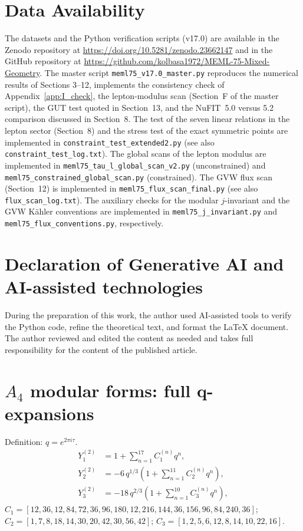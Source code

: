 \documentclass[12pt,a4paper]{article}
\numberwithin{equation}{section}
\begin{document}
\section*{Data Availability}
The datasets and the Python verification scripts (v17.0) are available in the Zenodo repository at \url{https://doi.org/10.5281/zenodo.23662147} and in the GitHub repository at \url{https://github.com/kolbasa1972/MEML-75-Mixed-Geometry}. The master script \texttt{meml75\_v17.0\_master.py} reproduces the numerical results of Sections 3--12, implements the consistency check of Appendix~\ref{app:I_check}, the lepton-modulus scan (Section~F of the master script), the GUT test quoted in Section~13, and the NuFIT~5.0 versus 5.2 comparison discussed in Section~8. The test of the seven linear relations in the lepton sector (Section~8) and the stress test of the exact symmetric points are implemented in \texttt{constraint\_test\_extended2.py} (see also \texttt{constraint\_test\_log.txt}). The global scans of the lepton modulus are implemented in \texttt{meml75\_tau\_l\_global\_scan\_v2.py} (unconstrained) and \texttt{meml75\_constrained\_global\_scan.py} (constrained). The GVW flux scan (Section~12) is implemented in \texttt{meml75\_flux\_scan\_final.py} (see also \texttt{flux\_scan\_log.txt}). The auxiliary checks for the modular \(j\)-invariant and the GVW Kähler conventions are implemented in \texttt{meml75\_j\_invariant.py} and \texttt{meml75\_flux\_conventions.py}, respectively.

\section*{Declaration of Generative AI and AI-assisted technologies}
During the preparation of this work, the author used AI-assisted tools to verify the Python code, refine the theoretical text, and format the LaTeX document. The author reviewed and edited the content as needed and takes full responsibility for the content of the published article.

\appendix
\newpage

\section{\(A_4\) modular forms: full q-expansions}
Definition: \(q = e^{2\pi i\tau}\).
\begin{align}
Y_1^{(2)} &= 1 + \sum_{n=1}^{17} C_1^{(n)} q^n, \\
Y_2^{(2)} &= -6\, q^{1/3}\left(1 + \sum_{n=1}^{11} C_2^{(n)} q^n\right), \\
Y_3^{(2)} &= -18\, q^{2/3}\left(1 + \sum_{n=1}^{10} C_3^{(n)} q^n\right),
\end{align}
\(C_1 = [12, 36, 12, 84, 72, 36, 96, 180, 12, 216, 144, 36, 156, 96, 84, 240, 36]\);
\(C_2 = [1, 7, 8, 18, 14, 30, 20, 42, 30, 56, 42]\);
\(C_3 = [1, 2, 5, 6, 12, 8, 14, 10, 22, 16]\).
\end{document}
